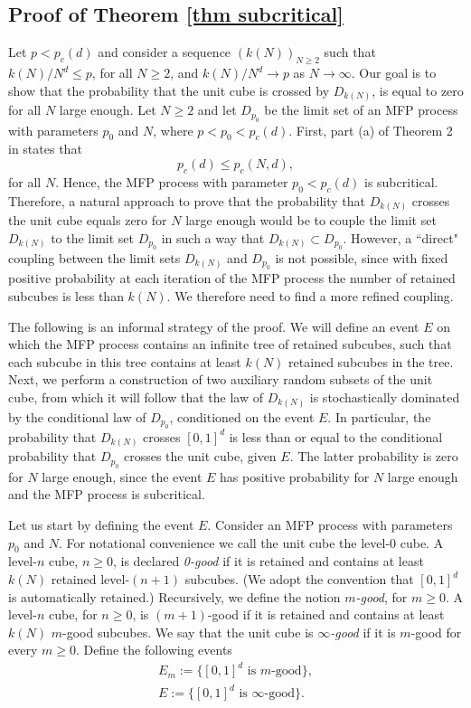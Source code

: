 \documentclass[11pt,a4paper]{article}
\newcommand{\pc}{\ensuremath{p_{c}(d)}}
\theoremstyle{remark}
\begin{document}
\subsection{Proof of Theorem \ref{thm subcritical}}\label{sec subcritical}

Let $p<\pc$ and consider a sequence $(k(N))_{N \geq 2}$ such that $k(N)/N^{d} \leq p$, for all $N \geq 2$, and $k(N)/N^d \to p$ as $N \to \infty$. Our goal is to show that the probability that the unit cube is crossed by $D_{k(N)}$, is equal to zero for all $N$ large enough. Let $N \geq 2$ and let $D_{p_{0}}$ be the limit set of an MFP process with parameters $p_0$ and $N$, where $p<p_0<\pc$. First, part (a) of Theorem 2 in \cite{FalGri} states that 
\begin{equation}\label{pc subcritical}
\pc \leq p_c(N,d),
\end{equation}
 for all $N$. Hence, the MFP process with parameter $p_0<\pc$ is subcritical. Therefore, a natural approach to prove that the probability that $D_{k(N)}$ crosses the unit cube equals zero for $N$ large enough would be to couple the limit set $D_{k(N)}$ to the limit set $D_{p_{0}}$ in such a way that $D_{k(N)} \subset D_{p_{0}}$. However, a ``direct" coupling between the limit sets $D_{k(N)}$ and $D_{p_{0}}$ is not possible, since with fixed positive probability at each iteration of the MFP process the number of retained subcubes is less than $k(N)$. We therefore need to find a more refined coupling.


The following is an informal strategy of the proof. We will define an event $E$ on which the MFP process contains an infinite tree of retained subcubes, such that each subcube in this tree contains at least $k(N)$ retained subcubes in the tree. Next, we perform a construction of two auxiliary random subsets of the unit cube, from which it will follow that the law of $D_{k(N)}$ is stochastically dominated by the conditional law of $D_{p_0}$, conditioned on the event $E$. In particular, the probability that $D_{k(N)}$ crosses $[0,1]^d$ is less than or equal to the conditional probability that $D_{p_{0}}$ crosses the unit cube, given $E$. The latter probability is zero for $N$ large enough, since the event $E$ has positive probability for $N$ large enough and the MFP process is subcritical.


Let us start by defining the event $E$. Consider an MFP process with parameters $p_0$ and $N$. For notational convenience we call the unit cube the level-0 cube. A level-$n$ cube, $n \geq 0$, is declared \emph{0-good} if it is retained and contains at least $k(N)$ retained level-$(n+1)$ subcubes. (We adopt the convention that $[0,1]^d$ is automatically retained.)
Recursively, we define the notion \emph{$m$-good}, for $m\geq 0$. A level-$n$ cube, for $n\geq 0$, is $(m+1)$-good if it is retained and contains at least $k(N)$ $m$-good subcubes. We say that the unit cube is \emph{$\infty$-good} if it is $m$-good for every $m\geq0$. Define the following events
\begin{eqnarray}
 E_m := \{ [0,1]^d  \text{ is } m\text{-good}\}, \label{E_m} \nonumber \\
 E:= \{[0,1]^d \text{ is } \infty\text{-good}\}. \label{E}
\end{eqnarray}
\end{document}
